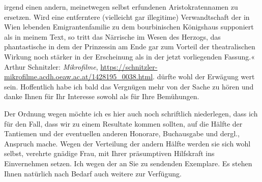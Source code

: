 {{{                     irgend einen andern, meinetwegen selbst erfundenen Aristokratennamen zu ersetzen. Wird
                     eine entferntere \introOben{}(\introOben{}vielleicht gar illegitime\introOben{})\introOben{}
                     Verwandtschaft der in Wien lebenden Emigrantenfamilie zu dem bourbinischen Königshaus
                     supponiert als in meinem Text, so tritt das
                     Närrische im Wesen des Herzogs, das phantastische in dem der Prinzessin am Ende gar zum Vorteil der theatralischen Wirkung noch
                     stärker in der Erscheinung als in der jetzt
                     vorliegenden Fassung.« Arthur Schnitzler: \emph{Mikrofilme}, \url{https://schnitzler-mikrofilme.acdh.oeaw.ac.at/1428195_0038.html}.}}}\label{K_L03950-2} dürfte wohl der Erwägung wert sein. Hoffentlich habe ich bald das
               Vergnügen mehr von der Sache zu hören und danke Ihnen für Ihr Interesse sowohl als
               für Ihre Bemühungen.\pend
           
\pstart
           Der Ordnung wegen möchte ich es hier auch noch schriftlich niederlegen, dass ich für
               den Fall, dass wir zu einem Resultate kommen sollten, auf die Hälfte der Tantiemen
               und der eventuellen anderen Honorare, Buchausgabe und dergl., Anspruch mache. Wegen
               der Verteilung der andern Hälfte werden sie sich wohl selbst, verehrte gnädige Frau,
               mit Ihrer präsumptiven Hilfskraft ins Einvernehmen setzen. Ich \label{K_L03950-3v}\label{K_L03950-3} wegen der an Sie zu
               sendenden Exemplare. Es stehen
               Ihnen natürlich nach Bedarf auch weitere zur Verfügung.\pend
           
